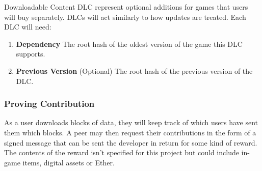 Downloadable Content DLC represent optional additions for games that users will buy separately. DLCs will act similarly to how updates are treated. Each DLC will need:

\begin{enumerate}
  \item \textbf{Dependency} The root hash of the oldest version of the game this DLC supports.
  \item \textbf{Previous Version} (Optional) The root hash of the previous version of the DLC.
\end{enumerate}

\subsubsection*{Proving Contribution}

As a user downloads blocks of data, they will keep track of which users have sent them which blocks. A peer may then request their contributions in the form of a signed message that can be sent the developer  in return for some kind of reward. The contents of the reward isn't specified for this project but could include in-game items, digital assets or Ether.